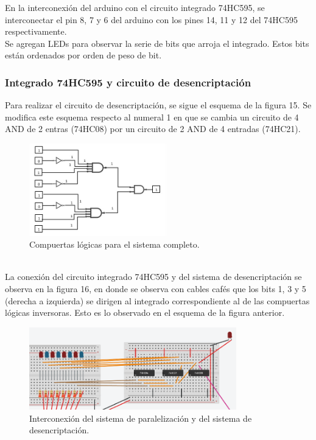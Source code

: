 \documentclass{article}
\begin{document}
En la interconexión del arduino con el circuito integrado 74HC595, se interconectar el pin 8, 7 y 6 del arduino con los pines 14, 11 y 12 del 74HC595 respectivamente.\\

Se agregan LEDs para observar la serie de bits que arroja el integrado. Estos bits están ordenados por orden de peso de bit.

\subsubsection{Integrado 74HC595 y circuito de desencriptación}

Para realizar el circuito de desencriptación, se sigue el esquema de la figura 15. Se modifica este esquema respecto al numeral 1 en que se cambia un circuito de 4 AND de 2 entras (74HC08) por un circuito de 2 AND de 4 entradas (74HC21).

\newpage

\begin{figure}[h]
\includegraphics[width=6cm]{compuertas_sistema_completo.PNG}
\centering
\caption{Compuertas lógicas para el sistema completo.}
\label{fig:compuertas_sistema_completo.PNG}
\end{figure}
\cite{completo}\\

La conexión del circuito integrado 74HC595 y del sistema de desencriptación se observa en la figura 16, en donde se observa con cables cafés que los bits 1, 3 y 5 (derecha a izquierda) se dirigen al integrado correspondiente al de las compuertas lógicas inversoras. Esto es lo observado en el esquema de la figura anterior.


\begin{figure}[h]
\includegraphics[width=9cm]{74HC595 y sistema desencriptacion.PNG}
\centering
\caption{Interconexión del sistema de paralelización y del sistema de desencriptación.}
\label{fig:74HC595 y sistema desencriptacion.PNG}
\end{figure}
\cite{completo}\\
\end{document}
